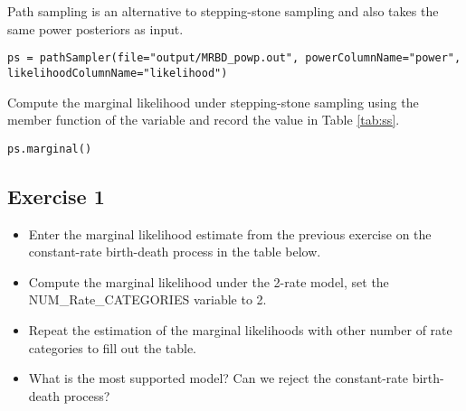 Path sampling is an alternative to stepping-stone sampling and also takes the same power posteriors as input. 
{\tt \small \begin{snugshade*}
\begin{lstlisting}
ps = pathSampler(file="output/MRBD_powp.out", powerColumnName="power", likelihoodColumnName="likelihood")
\end{lstlisting}
\end{snugshade*}}

Compute the marginal likelihood under stepping-stone sampling using the member function  of the  variable and record the value in Table \ref{tab:ss}.
{\tt \begin{snugshade*}
\begin{lstlisting}
ps.marginal() 
\end{lstlisting}
\end{snugshade*}}




\subsection{Exercise 1}

\begin{itemize}
\item Enter the marginal likelihood estimate from the previous exercise on the constant-rate birth-death process in the table below.
\item Compute the marginal likelihood under the 2-rate model, \IE set the NUM\_Rate\_CATEGORIES variable to 2.
\item Repeat the estimation of the marginal likelihoods with other number of rate categories to fill out the table.
\item What is the most supported model? Can we reject the constant-rate birth-death process?
\end{itemize}

